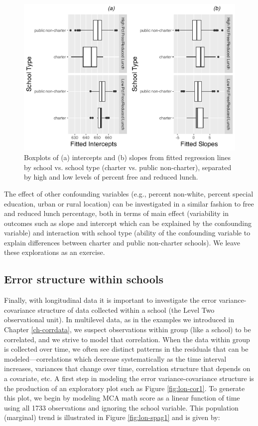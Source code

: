\documentclass[
]{krantz}
\begin{document}
\begin{figure}

{\centering \includegraphics[width=0.6\linewidth]{bookdown-BeyondMLR_files/figure-latex/lon-boxmat1-1} 

}

\caption{Boxplots of (a) intercepts and (b) slopes from fitted regression lines by school vs. school type (charter vs. public non-charter), separated by high and low levels of percent free and reduced lunch.}\label{fig:lon-boxmat1}
\end{figure}

The effect of other confounding variables (e.g., percent non-white, percent special education, urban or rural location) can be investigated in a similar fashion to free and reduced lunch percentage, both in terms of main effect (variability in outcomes such as slope and intercept which can be explained by the confounding variable) and interaction with school type (ability of the confounding variable to explain differences between charter and public non-charter schools). We leave these explorations as an exercise.

\hypertarget{lineartwostageerror2}{%
\subsection{Error structure within schools}\label{lineartwostageerror2}}

Finally, with longitudinal data it is important to investigate the error variance-covariance structure of data collected within a school (the Level Two observational unit). In multilevel data, as in the examples we introduced in Chapter \ref{ch-corrdata}, we suspect observations within group (like a school) to be correlated, and we strive to model that correlation. When the data within group is collected over time, we often see distinct patterns in the residuals that can be modeled---correlations which decrease systematically as the time interval increases, variances that change over time, correlation structure that depends on a covariate, etc. A first step in modeling the error variance-covariance structure is the production of an exploratory plot such as Figure \ref{fig:lon-cor1}. To generate this plot, we begin by modeling MCA math score as a linear function of time using all 1733 observations and ignoring the school variable. This population (marginal) trend is illustrated in Figure \ref{fig:lon-spag1} and is given by:
\end{document}
